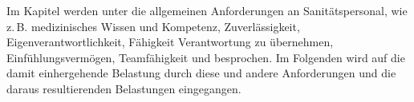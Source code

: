 \Text
{{\TxBeschreibung}}%
{%
Im Kapitel   werden unter
 die allgemeinen Anforderungen an Sanitätspersonal, wie
z.\,B. medizinisches Wissen und Kompetenz, Zuverlässigkeit, 
Eigenverantwortlichkeit, Fähigkeit Verantwortung
zu übernehmen, Einfühlungsvermögen, Teamfähigkeit und 
 besprochen. Im Folgenden wird auf
die damit einhergehende Belastung durch diese und andere
Anforderungen und die daraus resultierenden Belastungen
eingegangen.
% 
% 
% 
}
